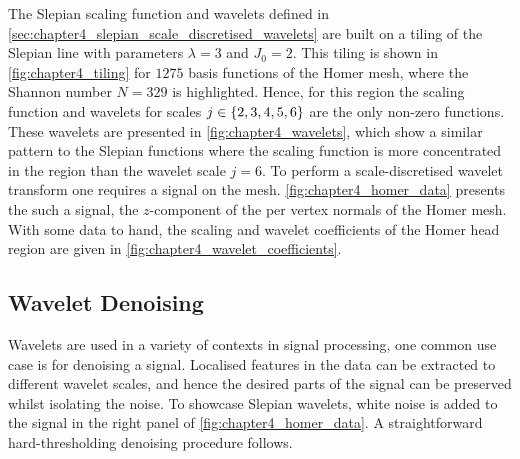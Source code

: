 The Slepian scaling function and wavelets defined in \cref{sec:chapter4_slepian_scale_discretised_wavelets} are built on a tiling of the Slepian line with parameters \(\lambda=3\) and \(J_{0}=2\).
This tiling is shown in \cref{fig:chapter4_tiling} for \(\num{1275}\) basis functions of the Homer mesh, where the Shannon number \(N=329\) is highlighted.
Hence, for this region the scaling function and wavelets for scales \(j \in \{2, 3, 4, 5, 6\}\) are the only non-zero functions.
These wavelets are presented in \cref{fig:chapter4_wavelets}, which show a similar pattern to the Slepian functions where the scaling function is more concentrated in the region than the wavelet scale \(j=6\).
To perform a scale-discretised wavelet transform one requires a signal on the mesh.
\cref{fig:chapter4_homer_data} presents the such a signal, the \(z\)-component of the per vertex normals of the Homer mesh.
With some data to hand, the scaling and wavelet coefficients of the Homer head region are given in \cref{fig:chapter4_wavelet_coefficients}.







\subsection{Wavelet Denoising}\label{sec:chapter4_wavelet_denoising}

Wavelets are used in a variety of contexts in signal processing, one common use case is for denoising a signal.
Localised features in the data can be extracted to different wavelet scales, and hence the desired parts of the signal can be preserved whilst isolating the noise.
To showcase Slepian wavelets, white noise is added to the signal in the right panel of \cref{fig:chapter4_homer_data}.
A straightforward hard-thresholding denoising procedure follows.

